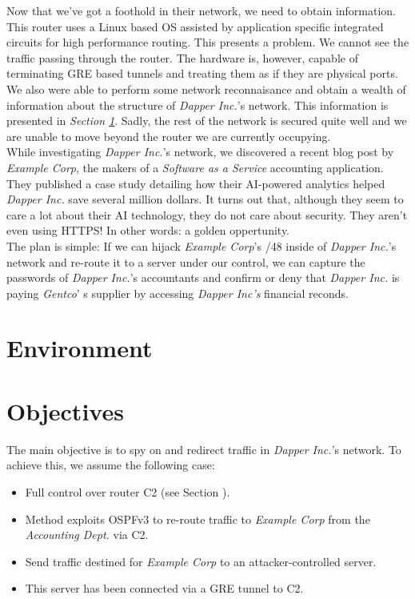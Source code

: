 \documentclass[11pt,a4paper,oneside]{article}
\begin{document}
    		Now that we've got a foothold in their network, we need to obtain information. This router uses a Linux based OS assisted by application specific integrated circuits for high performance routing. This presents a problem. We cannot see the traffic passing through the router. The hardware is, however, capable of terminating GRE based tunnels and treating them as if they are physical ports. We also were able to perform some network reconnaisance and obtain a wealth of information about the structure of \textit{Dapper Inc.}'s network. This information is presented in \textit{Section \ref{Environment}}. Sadly, the rest of the network is secured quite well and we are unable to move beyond the router we are currently occupying.\\
    		While investigating \textit{Dapper Inc.}'s network, we discovered a recent blog post by \textit{Example Corp}, the makers of a \textit{Software as a Service} accounting application. They published a case study detailing how their AI-powered analytics helped \textit{Dapper Inc.} save several million dollars. It turns out that, although they seem to care a lot about their AI technology, they do not care about security. They aren't even using HTTPS! In other words: a golden oppertunity.\\
    		The plan is simple: If we can hijack \textit{Example Corp}'s /48 inside of \textit{Dapper Inc.}'s network and re-route it to a server under our control, we can capture the passwords of \textit{Dapper Inc.}'s accountants and confirm or deny that \textit{Dapper Inc.} is paying \textit{Gentco}' s supplier by accessing \textit{Dapper Inc's} financial reconds.
    		
    \section{Environment}\label{Environment}
    		
    \section{Objectives}\label{Objectives}
		The main objective is to spy on and redirect traffic in \textit{Dapper Inc.}'s network. To achieve this, we assume the following case:
		\begin{itemize}
			\item Full control over router C2 (see Section \label{Environment}).
			\item Method exploits OSPFv3 to re-route traffic to \textit{Example Corp} from the \textit{Accounting Dept.} via C2.
			\item Send traffic destined for \textit{Example Corp} to an attacker-controlled server.
			\item This server has been connected via a GRE tunnel to C2.
		\end{itemize}
		
\end{document}
